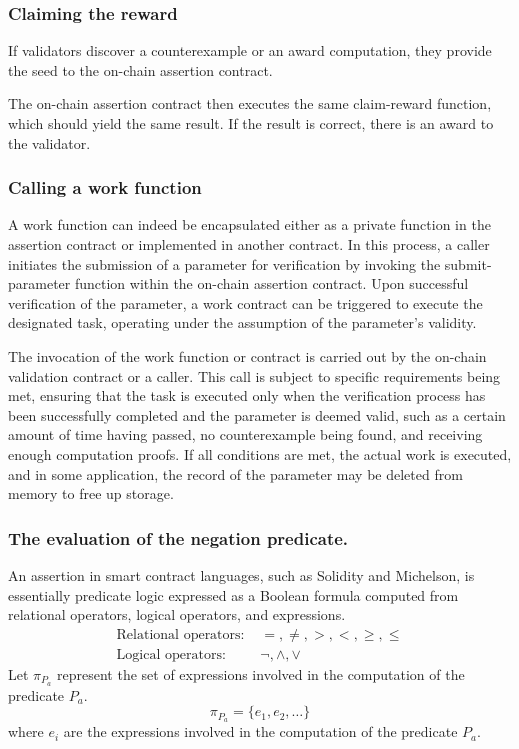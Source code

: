 \documentclass[runningheads]{llncs}
\begin{document}
\subsubsection{Claiming the reward} 
If validators discover a counterexample or an award computation, they provide the seed%
to the on-chain assertion contract. 

The on-chain assertion contract then executes the same claim-reward function, which should yield the same result.  If the result is correct, there is an award to the validator. %


\subsubsection{Calling a work function}
A work function can indeed be encapsulated either as a private function in the assertion contract or implemented in another contract. In this process, a caller initiates the submission of a parameter for verification by invoking the submit-parameter function within the on-chain assertion contract. Upon successful verification of the parameter, a work contract can be triggered to execute the designated task, operating under the assumption of the parameter's validity.

The invocation of the work function or contract is carried out by the on-chain validation contract or a caller. This call is subject to specific requirements being met, ensuring that the task is executed only when the verification process has been successfully completed and the parameter is deemed valid, such as a certain amount of time having passed, no counterexample being found, and receiving enough computation proofs. If all conditions are met, the actual work is executed, and in some application, the record of the parameter may be deleted from memory to free up storage.
\subsubsection{The evaluation of the negation predicate.} An assertion in smart contract languages, such as Solidity and Michelson, is essentially predicate logic expressed as a Boolean formula computed from relational operators, logical operators, and expressions. 
\begin{align}
\text{Relational operators: } & =, \neq, >, <, \geq, \leq \\
\text{Logical operators: } & \neg, \land, \lor
\end{align}
Let $\pi_{P_{a}}$ represent the set of expressions involved in the computation of the predicate $P_a$.
\begin{equation}
\pi_{P_{a}} = \{ e_1, e_2, \ldots \}
\end{equation}
where $e_i$ are the expressions involved in the computation of the predicate $P_a$.
\end{document}
